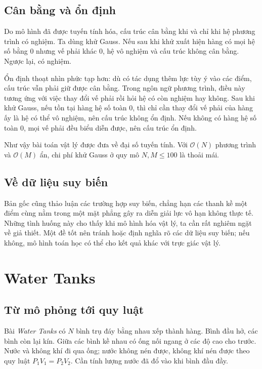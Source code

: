 \documentclass[11pt]{article}
\newcommand{\Oh}{\mathcal{O}}
\begin{document}
\subsection{Cân bằng và ổn định}

Do mô hình đã được tuyến tính hóa, cấu trúc cân bằng khi và chỉ khi hệ phương
trình có nghiệm. Ta dùng khử Gauss. Nếu sau khi khử xuất hiện hàng có mọi hệ
số bằng \(0\) nhưng vế phải khác \(0\), hệ vô nghiệm và cấu trúc không cân
bằng. Ngược lại, có nghiệm.

Ổn định thoạt nhìn phức tạp hơn: dù có tác dụng thêm lực tùy ý vào các điểm,
cấu trúc vẫn phải giữ được cân bằng. Trong ngôn ngữ phương trình, điều này
tương ứng với việc thay đổi vế phải rồi hỏi hệ có còn nghiệm hay không. Sau
khi khử Gauss, nếu tồn tại hàng hệ số toàn \(0\), thì chỉ cần thay đổi vế phải
của hàng ấy là hệ có thể vô nghiệm, nên cấu trúc không ổn định. Nếu không có
hàng hệ số toàn \(0\), mọi vế phải đều biểu diễn được, nên cấu trúc ổn định.

Như vậy bài toán vật lý được đưa về đại số tuyến tính. Với \(\Oh(N)\) phương
trình và \(\Oh(M)\) ẩn, chi phí khử Gauss ở quy mô \(N,M\le100\) là thoải mái.

\subsection{Về dữ liệu suy biến}

Bản gốc cũng thảo luận các trường hợp suy biến, chẳng hạn các thanh kề một
điểm cùng nằm trong một mặt phẳng gây ra diễn giải lực vô hạn không thực tế.
Những tình huống này cho thấy khi mô hình hóa vật lý, ta cần rất nghiêm ngặt
về giả thiết. Một đề tốt nên tránh hoặc định nghĩa rõ các dữ liệu suy biến;
nếu không, mô hình toán học có thể cho kết quả khác với trực giác vật lý.

\section{Water Tanks}

\subsection{Từ mô phỏng tới quy luật}

Bài \textit{Water Tanks} có \(N\) bình trụ đáy bằng nhau xếp thành hàng. Bình
đầu hở, các bình còn lại kín. Giữa các bình kề nhau có ống nối ngang ở các độ
cao cho trước. Nước và không khí đi qua ống; nước không nén được, không khí
nén được theo quy luật \(P_1V_1=P_2V_2\). Cần tính lượng nước đã đổ vào khi
bình đầu đầy.
\end{document}
